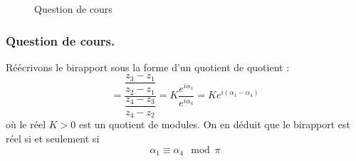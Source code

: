 \begin{figure}[ht]
 \centering

\caption{Question de cours}
\label{fig:Cdishyp_1}
\end{figure}
\subsubsection*{Question de cours.}
Réécrivons le birapport sous la forme d'un quotient de quotient :
\begin{displaymath}
 [z_1,z_2,z_3,z_4] = \dfrac{\dfrac{z_3-z_1}{z_2-z_1}}{\dfrac{z_4-z_3}{z_4-z_2}} = K\dfrac{e^{i\alpha_1}}{e^{i\alpha_4}}=Ke^{i(\alpha_1-\alpha_4)}
\end{displaymath}
où le réel $K>0$ est un quotient de modules. On en déduit que le birapport est réel si et seulement si
\begin{displaymath}
 \alpha_1 \equiv \alpha_4 \mod \pi
\end{displaymath}


